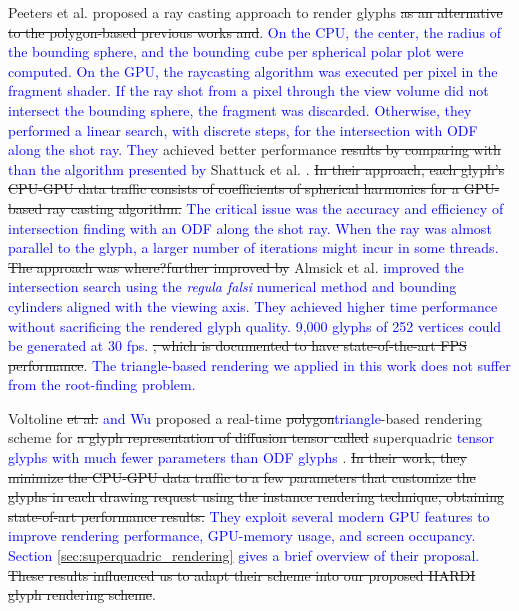 \documentclass[twoside,twocolumn,10pt]{article}
\begin{document}
Peeters et al. \cite{peeters2009} proposed a ray casting approach to render glyphs\sout{ as an alternative to the polygon-based previous works and}. \textcolor{blue}{On the CPU, the center, the radius of the bounding sphere, and the bounding cube per spherical polar plot were computed. On the GPU, the raycasting algorithm was executed per pixel in the fragment shader. If the ray shot from a pixel through the view volume did not intersect the bounding sphere, the fragment was discarded. Otherwise, they performed a linear search, with discrete steps, for the intersection with ODF along the shot ray. They} achieved better performance \sout{results by comparing with} \textcolor{blue}{than the algorithm presented by} Shattuck et al. \cite{shattuck2008}. \sout{In their approach, each glyph's CPU-GPU data traffic consists of coefficients of spherical harmonics for a GPU-based ray casting algorithm.} \textcolor{blue}{The critical issue was the accuracy and efficiency of intersection finding with an ODF along the shot ray. When the ray was almost parallel to the glyph, a larger number of iterations might incur in some threads.} \sout{The approach was \sout{where?}further improved by} Almsick et al. \cite{almsick2011} \textcolor{blue}{improved the intersection search using the \textit{regula falsi} numerical method and bounding cylinders aligned with the viewing axis. They achieved higher time performance without sacrificing the rendered glyph quality. 9,000 glyphs of 252 vertices could be generated at 30 fps}. \sout{, which is documented to have state-of-the-art FPS performance}.  \textcolor{blue}{The triangle-based rendering we applied in this work does not suffer from the root-finding problem.} 



Voltoline \sout{et al.} \textcolor{blue}{and Wu} \cite{voltoline2021} proposed a real-time \sout{polygon}\textcolor{blue}{triangle}-based rendering scheme for \sout{a glyph representation of diffusion tensor called} superquadric \textcolor{blue}{tensor glyphs with much fewer parameters than ODF glyphs} \cite{Kindlmann2004}. \sout{In their work, they minimize the CPU-GPU data traffic to a few parameters that customize the glyphs in each drawing request using the instance rendering technique, obtaining state-of-art performance results.} \textcolor{blue}{They exploit several modern GPU features to improve rendering performance, GPU-memory usage, and screen occupancy. Section \ref{sec:superquadric_rendering} gives a brief overview of their proposal.} \sout{These results influenced us to adapt their scheme into our proposed HARDI glyph rendering scheme}\textcolor{blue}{}.
\end{document}
